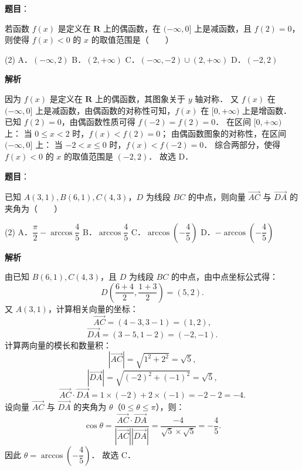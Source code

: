 \begin{answer}

\textbf{题目}：

若函数 $f(x)$ 是定义在 $\mathbf{R}$ 上的偶函数，在 $(-\infty, 0]$ 上是减函数，且 $f(2) = 0$，则使得 $f(x) < 0$ 的 $x$ 的取值范围是\mbox{（　　）}

\begin{gkopts}(2)
\task A．$(-\infty, 2)$
\task B．$(2, +\infty)$
\task C．$(-\infty, -2) \cup (2, +\infty)$
\task D．$(-2, 2)$
\end{gkopts}

\textbf{解析}

因为 $f(x)$ 是定义在 $\mathbf{R}$ 上的偶函数，其图象关于 $y$ 轴对称．
又 $f(x)$ 在 $(-\infty, 0]$ 上是减函数，由偶函数的对称性可知，$f(x)$ 在 $[0, +\infty)$ 上是增函数．
已知 $f(2) = 0$，由偶函数性质可得 $f(-2) = f(2) = 0$．
在区间 $[0, +\infty)$ 上：
当 $0 \leqslant x < 2$ 时，$f(x) < f(2) = 0$；
由偶函数图象的对称性，在区间 $(-\infty, 0]$ 上：
当 $-2 < x \leqslant 0$ 时，$f(x) < f(-2) = 0$．
综合两部分，使得 $f(x) < 0$ 的 $x$ 的取值范围是 $(-2, 2)$．
故选 D．


\end{answer}
\begin{answer}

\textbf{题目}：

已知 $A(3, 1), B(6, 1), C(4, 3)$，$D$ 为线段 $BC$ 的中点，则向量 $\overrightarrow{AC}$ 与 $\overrightarrow{DA}$ 的夹角为\mbox{（　　）}

\begin{gkopts}(2)
\task A．$\dfrac{\pi}{2} - \arccos\dfrac{4}{5}$
\task B．$\arccos\dfrac{4}{5}$
\task C．$\arccos\left(-\dfrac{4}{5}\right)$
\task D．$-\arccos\left(-\dfrac{4}{5}\right)$
\end{gkopts}

\textbf{解析}

由已知 $B(6, 1), C(4, 3)$，且 $D$ 为线段 $BC$ 的中点，由中点坐标公式得：
\nopagebreak[4]
\[
D\left(\frac{6 + 4}{2}, \frac{1 + 3}{2}\right) = (5, 2).
\]
又 $A(3, 1)$，计算相关向量的坐标：
\nopagebreak[4]
\[
\overrightarrow{AC} = (4 - 3, 3 - 1) = (1, 2),
\]
\nopagebreak[4]
\[
\overrightarrow{DA} = (3 - 5, 1 - 2) = (-2, -1).
\]
计算两向量的模长和数量积：
\nopagebreak[4]
\[
|\overrightarrow{AC}| = \sqrt{1^2 + 2^2} = \sqrt{5},
\]
\nopagebreak[4]
\[
|\overrightarrow{DA}| = \sqrt{(-2)^2 + (-1)^2} = \sqrt{5},
\]
\nopagebreak[4]
\[
\overrightarrow{AC} \cdot \overrightarrow{DA} = 1 \times (-2) + 2 \times (-1) = -2 - 2 = -4.
\]
设向量 $\overrightarrow{AC}$ 与 $\overrightarrow{DA}$ 的夹角为 $\theta$（$0 \leqslant \theta \leqslant \pi$），则：
\nopagebreak[4]
\[
\cos\theta = \frac{\overrightarrow{AC} \cdot \overrightarrow{DA}}{|\overrightarrow{AC}| |\overrightarrow{DA}|} = \frac{-4}{\sqrt{5} \times \sqrt{5}} = -\frac{4}{5}.
\]
因此 $\theta = \arccos\left(-\dfrac{4}{5}\right)$．
故选 C．


\end{answer}
